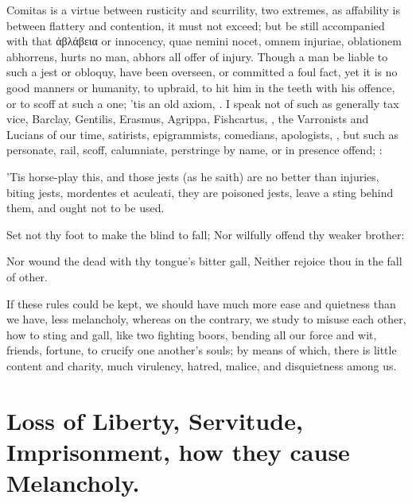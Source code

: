 {{Comitas is a virtue between rusticity and scurrility, two extremes, as
affability is between flattery and contention, it must not exceed; but
be still accompanied with that \textgreek[variant=ancient]{ἀβλάβεια} or innocency, quae nemini
nocet, omnem injuriae, oblationem abhorrens, hurts no man, abhors all
offer of injury. Though a man be liable to such a jest or obloquy, have
been overseen, or committed a foul fact, yet it is no good manners or
humanity, to upbraid, to hit him in the teeth with his offence, or to
scoff at such a one; 'tis an old axiom, . I speak not of such as generally tax vice, Barclay,
Gentilis, Erasmus, Agrippa, Fishcartus, \etc{}, the Varronists and Lucians
of our time, satirists, epigrammists, comedians, apologists, \etc{}, but
such as personate, rail, scoff, calumniate, perstringe by name, or in
presence offend;
:

'Tis horse-play this, and those jests (as he saith) are no better
than injuries, biting jests, mordentes et aculeati, they are poisoned
jests, leave a sting behind them, and ought not to be used.

Set not thy foot to make the blind to fall;
Nor wilfully offend thy weaker brother:

Nor wound the dead with thy tongue's bitter gall,
Neither rejoice thou in the fall of other.

If these rules could be kept, we should have much more ease and
quietness than we have, less melancholy, whereas on the contrary, we
study to misuse each other, how to sting and gall, like two fighting
boors, bending all our force and wit, friends, fortune, to crucify
one another's souls; by means of which, there is little content
and charity, much virulency, hatred, malice, and disquietness among us.

\section[Loss of Liberty, Servitude]{Loss of Liberty, Servitude, Imprisonment, how they cause Melancholy.}

}}
